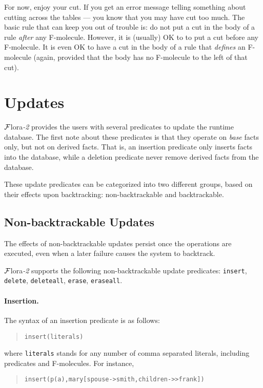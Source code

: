 \documentclass[11pt]{article}
\newcommand{\FLORA}{{\mbox{${\cal F}${\sc lora}\rm\emph{-2}}}\xspace}
\begin{document}
For now, enjoy your cut.  If you get an error message telling something
about cutting across the tables --- you know that you may have cut too much.
The basic rule that can keep you out of trouble is: do not put a cut
in the body of a rule \emph{after} any F-molecule. However, it is (usually)
OK to to put a cut before any F-molecule. It is even OK to have a cut in
the body of a rule that \emph{defines} an F-molecule (again, provided that
the body has no F-molecule to the left of that cut).


\section{Updates}


%
\FLORA provides the users with several predicates to update the runtime
database. The first note about these predicates is that they operate
on \emph{base} facts only, but not on derived facts. That is, an
insertion predicate only inserts facts into the database, while a
deletion predicate never remove derived facts from the database.

These update predicates can be categorized into two different groups,
based on their effects upon backtracking: non-backtrackable and
backtrackable.


\subsection{Non-backtrackable Updates} \label{sec:non-backtrackable-updates}


%
The effects of non-backtrackable updates persist once the operations are
executed, even when a later failure causes the system to backtrack.

\FLORA supports the following non-backtrackable update predicates:
{\tt insert}, {\tt delete}, {\tt deleteall}, {\tt erase}, {\tt eraseall}.

%
\paragraph{Insertion.} The syntax of an insertion predicate is as follows:
\begin{quote}
\verb|insert(literals)|
\end{quote}
where {\tt literals} stands for any number of comma separated literals,
including predicates and \mbox{F-molecules}. For instance,
\begin{quote}
\verb|insert(p(a),mary[spouse->smith,children->>frank])|
\end{quote}
\end{document}
